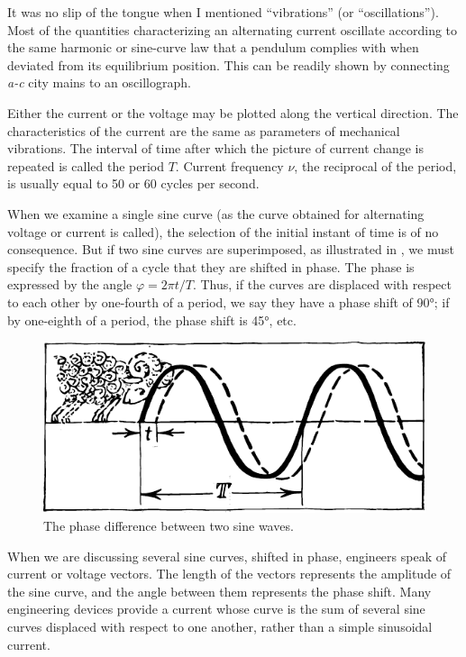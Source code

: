 It was no slip of the tongue when I mentioned ``vibrations'' (or ``oscillations''). Most of the quantities characterizing an alternating current oscillate according to the same harmonic or sine-curve law that a pendulum complies with when deviated from its equilibrium position. This can be readily shown by connecting \emph{a-c} city mains to an oscillograph.

Either the current or the voltage may be plotted along the vertical direction. The characteristics of the current are the same as parameters of mechanical vibrations. The interval of time after which the picture of current change is repeated is called the period $T$. Current frequency $\nu$, the reciprocal of the period, is usually equal to 50 or 60 cycles per second.

When we examine a single sine curve (as the curve obtained for alternating voltage or current is called), the selection of the initial instant of time is of no consequence. But if two sine curves are superimposed, as illustrated in , we must specify the fraction of a cycle that they are shifted in phase. The phase is expressed by the angle $\varphi =2 \pi t/T$. Thus, if the curves are displaced with respect to each other by one-fourth of a period, we say they have a phase shift of \ang{90}; if by one-eighth of a period, the phase shift is \ang{45}, etc.

\begin{figure}[!ht]
\centering
\includegraphics[width=\textwidth]{figures/fig-04-02.pdf}
\caption{The phase difference between two sine waves.}
\label{fig-4.2}
\end{figure}

When we are discussing several sine curves, shifted in phase, engineers speak of current or voltage vectors. The length of the vectors represents the amplitude of the sine curve, and the angle between them represents the phase shift. Many engineering devices provide a current whose curve is the sum of several sine curves displaced with respect to one another, rather than a simple sinusoidal current.

